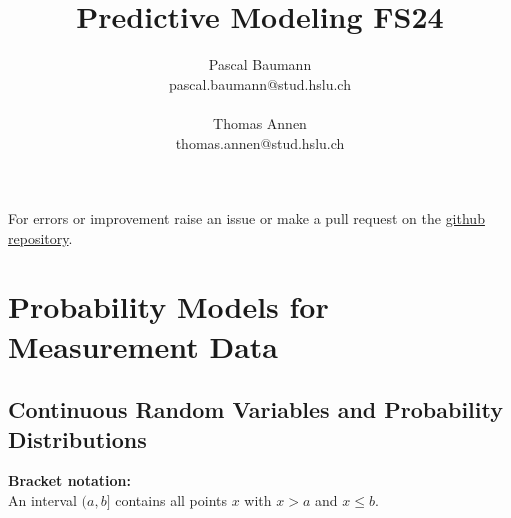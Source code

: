 \documentclass[11pt]{article}
\begin{document}
	
\title{Predictive Modeling FS24}
\author{Pascal Baumann\\pascal.baumann@stud.hslu.ch\\\\Thomas Annen\\thomas.annen@stud.hslu.ch}
\maketitle



For errors or improvement raise an issue or make a pull request on the \href{https://github.com/KilnOfTheSecondFlame/mse_summaries}{github repository}.

\tableofcontents
\newpage






\section{Probability Models for Measurement Data}

\subsection{Continuous Random Variables and Probability Distributions}

\begin{definition}
	\textbf{Bracket notation:}\\
	An interval $(a, b]$ contains all points $x$ with $x > a$ and $x \leq b$.
\end{definition}
\end{document}
